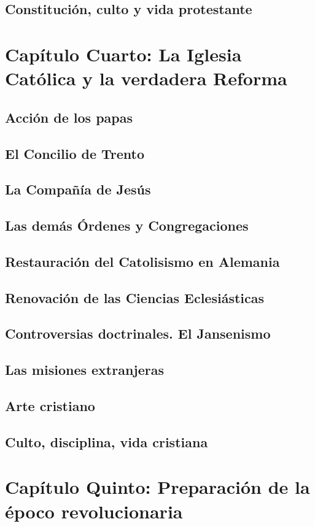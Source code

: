 \raggedbottom{} \documentclass[12pt]{book}
\begin{document}
\section{Constitución, culto y vida protestante}
\chapter{Capítulo Cuarto: La Iglesia Católica y la verdadera Reforma}
\section{Acción de los papas}
\section{El Concilio de Trento}
\section{La Compañía de Jesús}
\section{Las demás Órdenes y Congregaciones}
\section{Restauración del Catolisismo en Alemania}
\section{Renovación de las Ciencias Eclesiásticas}
\section{Controversias doctrinales. El Jansenismo}
\section{Las misiones extranjeras}
\section{Arte cristiano}
\section{Culto, disciplina, vida cristiana}
\chapter{Capítulo Quinto: Preparación de la époco revolucionaria}
\end{document}
